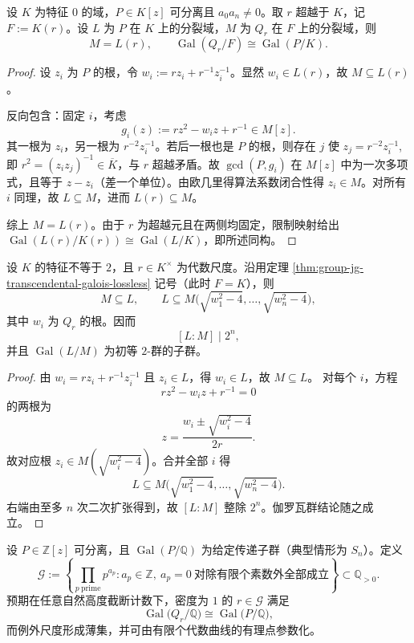 \begin{theorem}[超越尺度下的伽罗瓦全信息保持]\label{thm:group-jg-transcendental-galois-lossless}
设 \(K\) 为特征 \(0\) 的域，\(P\in K[z]\) 可分离且 \(a_0 a_n\neq 0\)。取 \(r\) 超越于 \(K\)，记 \(F:=K(r)\)。设 \(L\) 为 \(P\) 在 \(K\) 上的分裂域，\(M\) 为 \(Q_r\) 在 \(F\) 上的分裂域，则
\[
M=L(r),
\qquad
\operatorname{Gal}(Q_r/F)\cong \operatorname{Gal}(P/K).
\]
\end{theorem}
\begin{proof}
设 \(z_i\) 为 \(P\) 的根，令 \(w_i:=r z_i+r^{-1}z_i^{-1}\)。显然 \(w_i\in L(r)\)，故 \(M\subseteq L(r)\)。

反向包含：固定 \(i\)，考虑
\[
g_i(z):=r z^2-w_i z+r^{-1}\in M[z].
\]
其一根为 \(z_i\)，另一根为 \(r^{-2}z_i^{-1}\)。若后一根也是 \(P\) 的根，则存在 \(j\) 使
\(
z_j=r^{-2}z_i^{-1}
\),
即 \(r^2=(z_i z_j)^{-1}\in \overline{K}\)，与 \(r\) 超越矛盾。故 \(\gcd(P,g_i)\) 在 \(M[z]\) 中为一次多项式，且等于 \(z-z_i\)（差一个单位）。由欧几里得算法系数闭合性得 \(z_i\in M\)。对所有 \(i\) 同理，故 \(L\subseteq M\)，进而 \(L(r)\subseteq M\)。

综上 \(M=L(r)\)。由于 \(r\) 为超越元且在两侧均固定，限制映射给出
\(
\operatorname{Gal}(L(r)/K(r))\cong \operatorname{Gal}(L/K)
\)，即所述同构。
\end{proof}

\begin{proposition}[代数尺度下的二元纤维上界]\label{prop:group-jg-algebraic-scale-fiber-2power}
设 \(K\) 的特征不等于 \(2\)，且 \(r\in K^\times\) 为代数尺度。沿用定理 \ref{thm:group-jg-transcendental-galois-lossless} 记号（此时 \(F=K\)），则
\[
M\subseteq L,\qquad
L\subseteq M\bigl(\sqrt{w_1^2-4},\dots,\sqrt{w_n^2-4}\bigr),
\]
其中 \(w_i\) 为 \(Q_r\) 的根。因而
\[
[L:M]\mid 2^n,
\]
并且 \(\operatorname{Gal}(L/M)\) 为初等 \(2\)-群的子群。
\end{proposition}
\begin{proof}
由 \(w_i=r z_i+r^{-1}z_i^{-1}\) 且 \(z_i\in L\)，得 \(w_i\in L\)，故 \(M\subseteq L\)。
对每个 \(i\)，方程
\[
r z^2-w_i z+r^{-1}=0
\]
的两根为
\[
z=\frac{w_i\pm \sqrt{w_i^2-4}}{2r}.
\]
故对应根 \(z_i\in M(\sqrt{w_i^2-4})\)。合并全部 \(i\) 得
\[
L\subseteq M\bigl(\sqrt{w_1^2-4},\dots,\sqrt{w_n^2-4}\bigr).
\]
右端由至多 \(n\) 次二次扩张得到，故 \([L:M]\) 整除 \(2^n\)。伽罗瓦群结论随之成立。
\end{proof}



\begin{conjecture}\label{conj:group-jg-hilbert-coherence-godel-scales}
设 \(P\in \mathbb{Z}[z]\) 可分离，且 \(\operatorname{Gal}(P/\mathbb{Q})\) 为给定传递子群（典型情形为 \(S_n\)）。定义
\[
\mathcal{G}:=
\left\{
\prod_{p\ \mathrm{prime}}p^{a_p}:
a_p\in\mathbb{Z},\ a_p=0\ \text{对除有限个素数外全部成立}
\right\}
\subset \mathbb{Q}_{>0}.
\]
预期在任意自然高度截断计数下，密度为 \(1\) 的 \(r\in\mathcal{G}\) 满足
\[
\operatorname{Gal}\bigl(Q_r/\mathbb{Q}\bigr)\cong \operatorname{Gal}\bigl(P/\mathbb{Q}\bigr),
\]
而例外尺度形成薄集，并可由有限个代数曲线的有理点参数化。
\end{conjecture}

